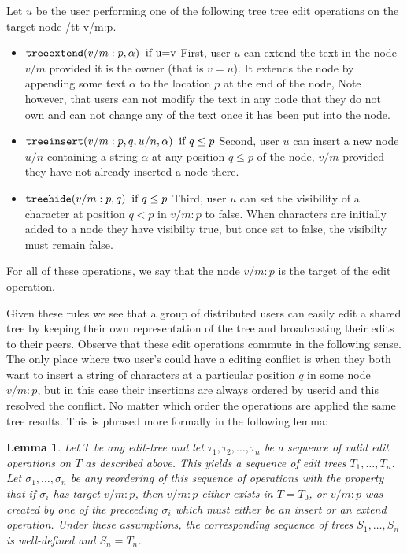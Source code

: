 \documentclass{amsart}
\newtheorem{lemma}[theorem]{Lemma}
\begin{document}
Let $u$ be the user performing one of the following tree tree edit operations
on the target node {/tt v/m:p}.
\begin{itemize}
\item ${\tt treeextend}(v/m:p,\alpha)\;\;\text{if u=v}$ \newline
First, user $u$ can extend the text in the node $v/m$
provided it is the owner (that is $v=u$). It extends the node by appending
some text $\alpha$ to the location $p$ at the end of the node,
Note however, that users can not modify
the text in any node that they do not own and can not change any of the text
once it has been put into the node.
\item ${\tt treeinsert}(v/m:p,q,u/n,\alpha) \;\; \text{if $q\le p$}$
\newline
Second, user $u$ can insert a new node $u/n$ containing a string $\alpha$
at any position $q\le p$ of the node, 
$v/m$ provided
they have not already inserted a node there.
\item ${\tt treehide}(v/m:p,q)  \;\; \text{if $q\le p$}$\newline
Third, user $u$ can set the visibility of a character at position $q < p$
in  $v/m:p$ to false.
When characters are initially added to a node they have visibilty true, but once
set to false, the visibilty must remain false. 
\end{itemize}
For all of these operations, we say that the node $v/m:p$ is the target of the edit operation.

Given these rules we see that a group of distributed users can easily edit a 
shared tree by keeping their own representation of the tree and broadcasting
their edits to their peers. Observe that these edit operations commute in
the following sense. The only place where two user's could have a editing
conflict is when they both want to insert a string of characters at a particular
position $q$ in some node $v/m:p$, but in this case their insertions are always
ordered by userid and this resolved the conflict. No matter which order the
operations are applied the same tree results. This is phrased more formally
in the following lemma:

\begin{lemma}
Let $T$ be any edit-tree and let $\tau_1,\tau_2,\ldots,\tau_n$
be a sequence of valid edit operations on $T$ as described above.
This yields a sequence of edit trees $T_1,\ldots,T_n$. Let 
$\sigma_1,\ldots,\sigma_n$ be any reordering of this sequence of operations
with the property that if $\sigma_i$ has target $v/m:p$, then $v/m:p$ either
exists in $T=T_0$, or $v/m:p$ was created by one of the preceeding $\sigma_i$
which must either be an insert or an extend operation.
Under these assumptions, the corresponding sequence of trees
$S_1,\ldots,S_n$ is well-defined and $S_n=T_n$.
\end{lemma}
\end{document}
